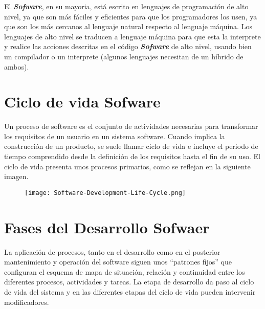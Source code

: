 \documentclass{article}
\begin{document}
El \textbf{\textit{Sofware}}, en su mayoria, está escrito en lenguajes de programación de alto nivel, ya que son más fáciles
y eficientes para que los programadores los usen, ya que son los más cercanos al lenguaje natural respecto al lenguaje máquina.
Los lenguajes de alto nivel se traducen a lenguaje máquina para que esta la interprete y realice las acciones descritas en el código
\textbf{\textit{Sofware}} de alto nivel, usando bien un compilador o un interprete (algunos lenguajes necesitan de un híbrido de ambos).

\section{Ciclo de vida Sofware}
Un proceso de software es el conjunto de actividades necesarias para transformar los requisitos de un usuario en un sistema software. 
Cuando implica la construcción de un producto, se suele llamar ciclo de vida e incluye el periodo de tiempo comprendido desde la definición 
de los requisitos hasta el fin de su uso. El ciclo de vida presenta unos procesos primarios, como se reflejan en la siguiente imagen.
\\

\begin{figure}[b]
   
    \texttt{[image: Software-Development-Life-Cycle.png]}
    \centering
    
\end{figure}

\newpage
\section{Fases del Desarrollo Sofwaer}
La aplicación de procesos, tanto en el desarrollo como en el posterior mantenimiento y operación del software siguen unos “patrones fijos” 
que configuran el esquema de mapa de situación, relación y continuidad entre los diferentes procesos, actividades y tareas. La etapa de 
desarrollo da paso al ciclo de vida del sistema y en las diferentes etapas del ciclo de vida pueden intervenir modificadores.
\end{document}
